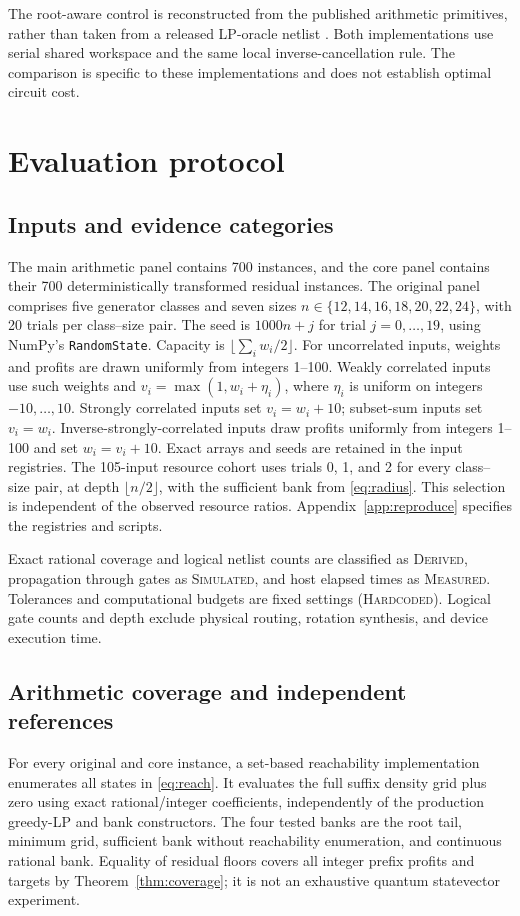 \documentclass[referee,pdflatex,sn-mathphys-num]{sn-jnl}
\theoremstyle{thmstyleone}
\theoremstyle{thmstyletwo}
\begin{document}
The root-aware control is reconstructed from the published arithmetic primitives, rather than taken from a released LP-oracle netlist \cite{wilkening2025,wilkening2025code}. Both implementations use serial shared workspace and the same local inverse-cancellation rule. The comparison is specific to these implementations and does not establish optimal circuit cost.

\section{Evaluation protocol}\label{sec:methods}
\subsection{Inputs and evidence categories}
The main arithmetic panel contains 700 instances, and the core panel contains their 700 deterministically transformed residual instances. The original panel comprises five generator classes and seven sizes $n\in\{12,14,16,18,20,22,24\}$, with 20 trials per class--size pair. The seed is $1000n+j$ for trial $j=0,\ldots,19$, using NumPy's \texttt{RandomState}. Capacity is $\lfloor\sum_iw_i/2\rfloor$. For uncorrelated inputs, weights and profits are drawn uniformly from integers 1--100. Weakly correlated inputs use such weights and $v_i=\max(1,w_i+\eta_i)$, where $\eta_i$ is uniform on integers $-10,\ldots,10$. Strongly correlated inputs set $v_i=w_i+10$; subset-sum inputs set $v_i=w_i$. Inverse-strongly-correlated inputs draw profits uniformly from integers 1--100 and set $w_i=v_i+10$. Exact arrays and seeds are retained in the input registries. The 105-input resource cohort uses trials 0, 1, and 2 for every class--size pair, at depth $\lfloor n/2\rfloor$, with the sufficient bank from \eqref{eq:radius}. This selection is independent of the observed resource ratios. Appendix~\ref{app:reproduce} specifies the registries and scripts.

Exact rational coverage and logical netlist counts are classified as \textsc{Derived}, propagation through gates as \textsc{Simulated}, and host elapsed times as \textsc{Measured}. Tolerances and computational budgets are fixed settings (\textsc{Hardcoded}). Logical gate counts and depth exclude physical routing, rotation synthesis, and device execution time.

\subsection{Arithmetic coverage and independent references}
For every original and core instance, a set-based reachability implementation enumerates all states in \eqref{eq:reach}. It evaluates the full suffix density grid plus zero using exact rational/integer coefficients, independently of the production greedy-LP and bank constructors. The four tested banks are the root tail, minimum grid, sufficient bank without reachability enumeration, and continuous rational bank. Equality of residual floors covers all integer prefix profits and targets by Theorem~\ref{thm:coverage}; it is not an exhaustive quantum statevector experiment.
\end{document}
